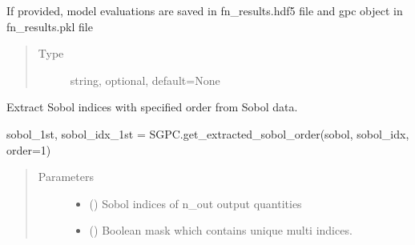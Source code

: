 \documentclass[letterpaper,10pt,english,openany,oneside]{sphinxmanual}
\begin{document}
\begin{fulllineitems}
\begin{fulllineitems}
\begin{quote}
\begin{description}
\end{description}\end{quote}

\end{fulllineitems}


\begin{fulllineitems}
\label{\detokenize{pygpc:pygpc.SGPC.SGPC.fn_results}}
If provided, model evaluations are saved in fn\_results.hdf5 file and gpc object in fn\_results.pkl file
\begin{quote}\begin{description}
\item[{Type}] \leavevmode
string, optional, default=None

\end{description}\end{quote}

\end{fulllineitems}


\begin{fulllineitems}
\label{\detokenize{pygpc:pygpc.SGPC.SGPC.get_extracted_sobol_order}}
Extract Sobol indices with specified order from Sobol data.

sobol\_1st, sobol\_idx\_1st = SGPC.get\_extracted\_sobol\_order(sobol, sobol\_idx, order=1)
\begin{quote}\begin{description}
\item[{Parameters}] \leavevmode\begin{itemize}
\item {} 
 (\sphinxstyleliteralemphasis{\sphinxupquote{ {[}}}\sphinxstyleliteralemphasis{\sphinxupquote{{]}}}) \textendash{} Sobol indices of n\_out output quantities

\item {} 
 () \textendash{} Boolean mask which contains unique multi indices.


\end{itemize}
\end{description}
\end{quote}
\end{fulllineitems}
\end{fulllineitems}
\end{document}
